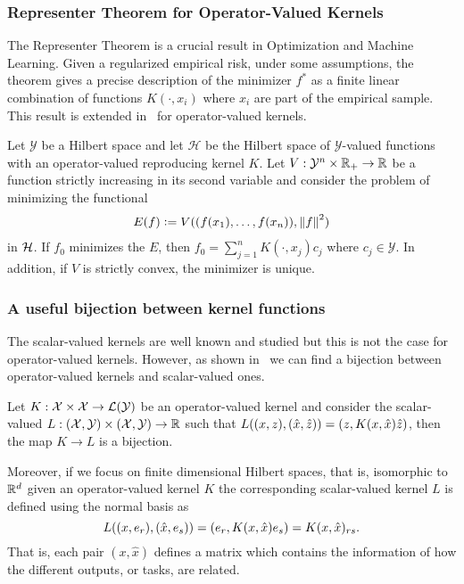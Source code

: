 \subsubsection*{Representer Theorem for Operator-Valued Kernels}
The Representer Theorem is a crucial result in Optimization and Machine Learning. Given a regularized empirical risk, under some assumptions, the theorem gives a precise description of the minimizer $f^*$ as a finite linear combination of functions $K(\cdot, x_i)$ where $x_i$ are part of the empirical sample.
This result is extended in~\cite[Theorem 4.2]{MicchelliP05} for operator-valued kernels.
\begin{theorem}
    Let $\mathcal{Y}$ be a Hilbert space and let $\mathcal{H}$ be the Hilbert space of $\mathcal{Y}$-valued functions with an operator-valued reproducing kernel $K$. Let $V: \mathcal{Y}^n \times \mathbb{R}_+ \to \mathbb{R}$ be a function strictly increasing in its second variable and consider the problem of minimizing the functional    
    \begin{equation}\label{eq:representer_functional}
        \begin{aligned}
            E(f) \defeq V((f(x_1), \ldots, f(x_n)), \norm{f}^2)
        \end{aligned}
    \end{equation}
    in $\mathcal{H}$.
    If
    $f_0$ minimizes the $E$, then $f_0 = \sum_{j=1}^n K(\cdot, x_j) c_j$ where $c_j \in \mathcal{Y}$. In addition, if $V$ is strictly convex, the minimizer is unique. 
\end{theorem}

\subsubsection*{A useful bijection between kernel functions}
The scalar-valued kernels are well known and studied but this is not the case for operator-valued kernels. However, as shown in~\cite{Hein04kernels,BaldassarreRBV12} we can find a bijection between operator-valued kernels and scalar-valued ones.
\begin{lemma}
    Let 
    $K: \mathcal{X} \times \mathcal{X} \to \mathcal{L}(\mathcal{Y})$
    be an operator-valued kernel and consider the scalar-valued
    $L: (\mathcal{X}, \mathcal{Y}) \times (\mathcal{X}, \mathcal{Y}) \to \mathbb{R}$
    such that $L((x, z), (\hat{x}, \hat{z})) = \left( z, K(x, \hat{x}) \hat{z} \right)$, then the map $K \to L$ is a bijection.
\end{lemma}
Moreover, if we focus on finite dimensional Hilbert spaces, that is, isomorphic to $\mathbb{R}^d$ given an operator-valued kernel $K$ the corresponding scalar-valued kernel $L$ is defined using the normal basis as
$$ L((x, e_r), (\hat{x}, e_s)) = \left( e_r, K(x, \hat{x}) e_s \right) = K(x, \hat{x})_{rs} .$$
That is, each pair $(x, \hat{x})$ defines a matrix which contains the information of how the different outputs, or tasks, are related.


